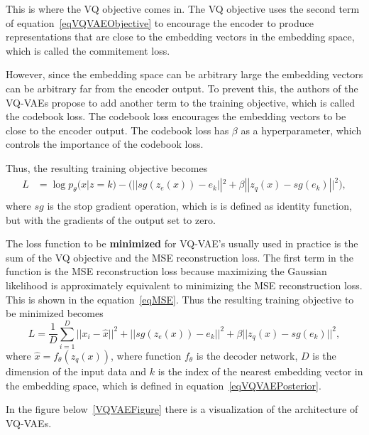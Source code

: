 This is where the VQ objective comes in. The VQ objective uses the second term of equation~\ref{eqVQVAEObjective} to encourage the encoder to produce representations that are close to the embedding vectors in the embedding space, which is called the commitement loss.\cite{vqvae}

However, since the embedding space can be arbitrary large the embedding vectors can be arbitrary far from the encoder output. To prevent this, the authors of the VQ-VAEs propose to add another term to the training objective, which is called the codebook loss. The codebook loss encourages the embedding vectors to be close to the encoder output. The codebook loss has $\beta$ as a hyperparameter, which controls the importance of the codebook loss.\cite{vqvae}

Thus, the resulting training objective becomes
\begin{equation} \label{eqVQVAEObjective}
    \begin{split}
        L &= \log p_{\theta}(x|z = k) - \biggl( || sg(z_e(x)) - e_k ||^2 + \beta || z_q(x) - sg(e_k) ||^2 \biggr),\\
    \end{split}
\end{equation}
where $sg$ is the stop gradient operation, which is is defined as identity function, but with the gradients of the output set to zero.

The loss function to be \textbf{minimized} for VQ-VAE's usually used in practice is the sum of the VQ objective and the MSE reconstruction loss.
The first term in the function is the MSE reconstruction loss because maximizing the Gaussian likelihood is approximately equivalent to minimizing the MSE reconstruction loss. This is shown in the equation~\ref{eqMSE}. 
Thus the resulting training objective to be minimized becomes
\[ L = \frac{1}{D} \sum_{i=1}^{D} ||x_i - \hat{x} ||^2 + || sg(z_e(x)) - e_k ||^2 + \beta || z_q(x) - sg(e_k) ||^2 , \]
where $\hat{x} = f_{\theta}(z_q(x))$, where function $f_{\theta}$ is the decoder network, $D$ is the dimension of the input data and $k$ is the index of the nearest embedding vector in the embedding space, which is defined in equation~\ref{eqVQVAEPosterior}. 

In the figure below~\ref{VQVAEFigure} there is a visualization of the architecture of VQ-VAEs.

